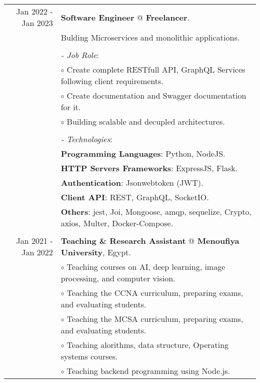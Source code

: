 \documentclass[a4paper,10pt]{article}
\begin{document}
\begin{longtable}{r|l}
    \\
    Jan 2022 - Jan 2023 & \textbf{Software Engineer} @ 
    \textbf{Freelancer}. \\&
    Bulding Microservices and monolithic applications.\\&
    \\&
    \textit{- Job Role}:\\&
    $\circ$ Create complete RESTfull API, GraphQL Services following client requirements. \\ &
    $\circ$ Create documentation and Swagger documentation for it. \\ &
    $\circ$ Building scalable and decupled architectures. \\ &
    \\&
    \textit{- Technologies}:\\&
    \textbf{Programming Languages}: Python, NodeJS.\\ &
    \textbf{HTTP Servers Frameworks}: ExpressJS, Flask.\\&
    \textbf{Authentication}: Jsonwebtoken (JWT).\\&
    \textbf{Client API}: REST, GraphQL, SocketIO.\\&
    \textbf{Others}: jest, Joi, Mongoose, amqp, sequelize, Crypto, axios, Multer, Docker-Compose.\\&  
    \\
    Jan 2021 - Jan 2022 & \textbf{Teaching \& Research Assistant} @ 
    \textbf{Menoufiya University}, Egypt. \\&
    $\circ$ Teaching courses on AI, deep learning, image processing, and computer vision. \\ &
    $\circ$ Teaching the CCNA curriculum, preparing exams, and evaluating students. \\ &
    $\circ$ Teaching the MCSA curriculum, preparing exams, and evaluating students. \\ &
    $\circ$ Teaching alorithms, data structure, Operating systems courses. \\&
    $\circ$ Teaching backend programming using Node.js. 
\end{longtable}
\end{document}
